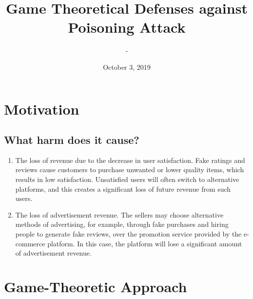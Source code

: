 \documentclass{article}
\title{Game Theoretical Defenses against Poisoning Attack}
\author{-}
\date{October 3, 2019}
\begin{document}
\newtheorem{thm}{Theorem}
\newtheorem{cor}{Corollary}
\newtheorem{lem}{Lemma}
\newtheorem{prop}{Proposition}
\newtheorem{conj}{Conjecture}
\newtheorem{algo}{Algorithm}
\newtheorem{obs}{Observation}
\newtheorem{clm}{Claim}
\theoremstyle{definition}
\newtheorem{df}{Definition}
\newtheorem{eg}{Example}
\newtheorem{asm}{Assumption}
\newtheorem{cond}{Condition}
\theoremstyle{remark}
\newtheorem{rmk}{Remark}
\maketitle \onehalfspacing \allowdisplaybreaks \raggedbottom


\section{Motivation} 

\subsection{What harm does it cause?}
\begin{enumerate}
\item The loss of revenue due to the decrease in user satisfaction. Fake ratings and reviews cause customers to purchase unwanted or lower quality items, which results in low satisfaction. Unsatisfied users will often switch to alternative platforms, and this creates a significant loss of future revenue from such users.
\item The loss of advertisement revenue. The sellers may choose alternative methods of advertising, for example, through fake purchases and hiring people to generate fake reviews, over the promotion service provided by the e-commerce platform. In this case, the platform will lose a significant amount of advertisement revenue.
\end{enumerate}





\section{Game-Theoretic Approach} 
\end{document}
